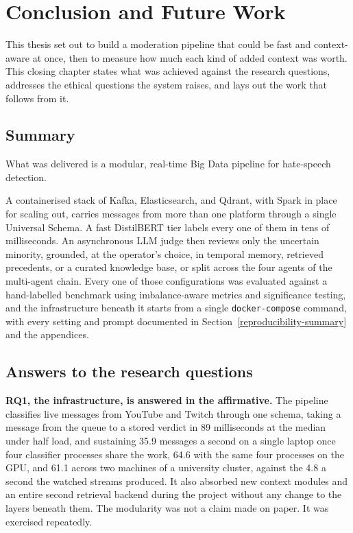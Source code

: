 \chapter{Conclusion and Future Work}\label{conclusion-and-future-work}

This thesis set out to build a moderation pipeline that could be fast and context-aware at once, then to measure how much each kind of added context was worth. This closing chapter states what was achieved against the research questions, addresses the ethical questions the system raises, and lays out the work that follows from it.

\section{Summary}\label{summary}

What was delivered is a modular, real-time Big Data pipeline for hate-speech detection.

A containerised stack of Kafka, Elasticsearch, and Qdrant, with Spark in place for scaling out, carries messages from more than one platform through a single Universal Schema. A fast DistilBERT tier labels every one of them in tens of milliseconds. An asynchronous LLM judge then reviews only the uncertain minority, grounded, at the operator's choice, in temporal memory, retrieved precedents, or a curated knowledge base, or split across the four agents of the multi-agent chain. Every one of those configurations was evaluated against a hand-labelled benchmark using imbalance-aware metrics and significance testing, and the infrastructure beneath it starts from a single \texttt{docker-compose} command, with every setting and prompt documented in Section~\ref{reproducibility-summary} and the appendices.

\section{Answers to the research questions}\label{answers-to-the-research-questions}

\textbf{RQ1, the infrastructure, is answered in the affirmative.} The pipeline classifies live messages from YouTube and Twitch through one schema, taking a message from the queue to a stored verdict in 89 milliseconds at the median under half load, and sustaining 35.9 messages a second on a single laptop once four classifier processes share the work, 64.6 with the same four processes on the GPU, and 61.1 across two machines of a university cluster, against the 4.8 a second the watched streams produced. It also absorbed new context modules and an entire second retrieval backend during the project without any change to the layers beneath them. The modularity was not a claim made on paper. It was exercised repeatedly.

